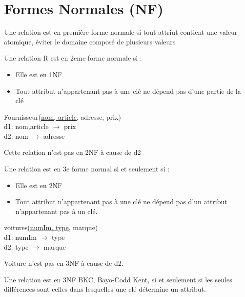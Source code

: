 \documentclass[12pt,a4paper,openany]{book}
\begin{document}
		\section{Formes Normales (NF)}
		\begin{definition}
			Une relation est en première forme normale si tout attriut contient une valeur atomique, éviter le domaine composé de plusieurs valeurs	
		\end{definition}
		\begin{definition}
			Une relation R est en 2eme forme normale si : 
			\begin{itemize}
				\item Elle est en 1NF
				\item Tout attribut n'appartenant pas à une clé ne dépend pas d'une partie de la clé
			\end{itemize}
		\end{definition}
		\begin{exemple}
			Fournisseur(\underline{nom, article}, adresse, prix)\\
			d1: nom,article $\rightarrow$ prix\\
			d2: nom $\rightarrow$ adresse

			Cette relation n'est pas en 2NF à cause de d2
		\end{exemple}
		\begin{definition}
			Une relation est en 3e forme normal si et seulement si : 
			\begin{itemize}
				\item Elle est en 2NF
				\item Tout attribut n'appartenant pas à une clé ne dépend pas d'un attribut n'appartenant pas à un clé.
			\end{itemize}
		\end{definition}
		\begin{exemple}
			voitures(\underline{numIm, type}, marque)\\
			d1: numIm $\rightarrow$ type\\
			d2: type $\rightarrow$ marque

			Voiture n'est pas en 3NF à cause de d2.
		\end{exemple}

		\begin{definition}
			Une relation est en 3NF BKC, Bayo-Codd Kent, si et seulement si les seules différences sont celles dans lesquelles une clé détermine un
			attribut.
		\end{definition}
\end{document}
